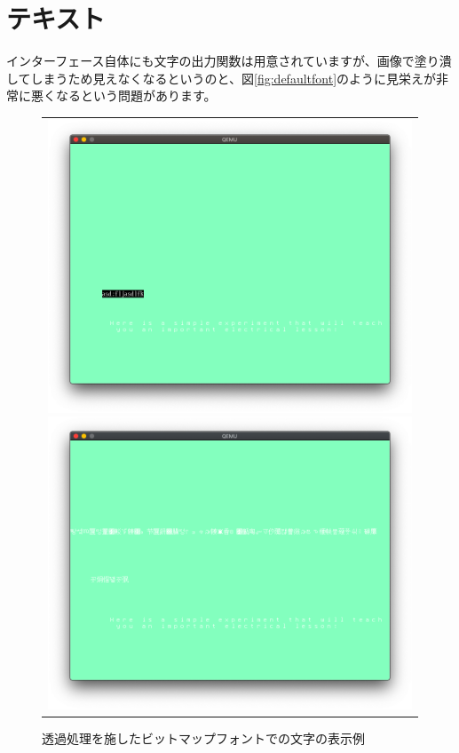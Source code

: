 \documentclass[10pt,b5paper,twoside,openany]{ltjsbook}
\begin{document}
\section{テキスト}
インターフェース自体にも文字の出力関数は用意されていますが、画像で塗り潰してしまうため見えなくなるというのと、図\ref{fig:defaultfont}のように見栄えが非常に悪くなるという問題があります。
\begin{figure}[H]
    \centering
    \begin{tabular}{c}
        \begin{minipage}{0.5\hsize}
            \centering
            \includegraphics[scale=0.22]{pic/defaultfont.png}
            \caption{標準インターフェースでの文字の表示例}
            \label{fig:defaultfont}
        \end{minipage}
        \begin{minipage}{0.5\hsize}
            \centering
            \includegraphics[scale=0.22]{pic/screenshot.png}
            \caption{透過処理を施したビットマップフォントでの文字の表示例}
            \label{fig:bitmapfont}
        \end{minipage}
    \end{tabular}  
\end{figure}
\end{document}
